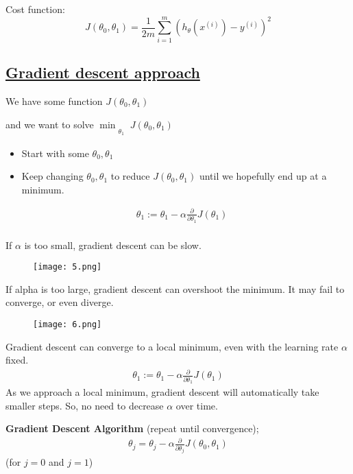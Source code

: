 \documentclass[12pt,a4paper,fleqn]{article}
\begin{document}
 Cost function:
 \[J\left(\theta_0, \theta_1\right)=\frac{1}{2 m} \sum_{i=1}^m{\left(h_\theta\left(x^{(i)}\right)-y^{(i)}\right)}^2\]
 


 \subsection{  \underline{ Gradient descent approach }  }  
 We have some function \(J\left(\theta_0, \theta_1\right)\)

 and we want to solve \(\min _{\substack{ \\\theta_1}} J\left(\theta_0, \theta_1\right)\)
 \begin{itemize}
    \item Start with some \(\theta_0, \theta_1\)
    \item Keep changing \(\theta_0, \theta_1\) to reduce \(J\left(\theta_0, \theta_1\right)\) until we hopefully end up at a minimum.
 \end{itemize}

 \begin{align*}
    & \theta_1:=\theta_1-\alpha \frac{\partial}{\partial \theta_1} J\left(\theta_1\right) \\
 \end{align*}
    
 If \(\alpha \) is too small, gradient descent can be slow.   
 \begin{figure}[ht]
    \centering
    \texttt{[image: 5.png]}
 \end{figure}
 
 If alpha is too large, gradient descent can overshoot the minimum. It may fail to converge, or even diverge.
 
 \begin{figure}[H]
     \centering
     \texttt{[image: 6.png]}
 \end{figure}

 Gradient descent can converge to a local minimum, even with the learning rate \(\alpha \)  fixed.
 \begin{align*}
 \theta_1:=\theta_1-\alpha \frac{\partial}{\partial \theta_1} J\left(\theta_1\right)
 \end{align*}
 As we approach a local minimum, gradient descent will automatically take smaller steps. So, no need to decrease \(\alpha \) over time.

 \textbf{Gradient Descent Algorithm} (repeat until convergence); 
 \begin{align*}
 \theta_j =\theta_j-\alpha\frac{\partial}{\partial \theta_{j}} J\left(\theta_0, \theta_1\right)
\end{align*}
 (for \(j=0\) and \(j=1\))
\end{document}
